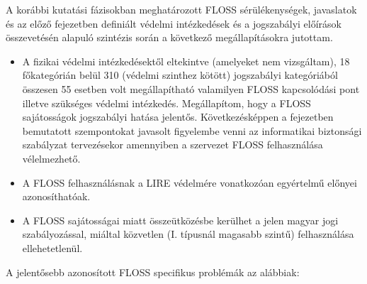 \documentclass[12pt,magyar,a4paper,oneside]{scrreprt}
\begin{document}
A korábbi kutatási fázisokban meghatározott FLOSS sérülékenységek,
javaslatok és az előző fejezetben definiált védelmi intézkedések és a
jogszabályi előírások összevetésén alapuló szintézis során a következő
megállapításokra jutottam.

\begin{itemize}
\item
  A fizikai védelmi intézkedésektől eltekintve (amelyeket nem
  vizsgáltam), 18 főkategórián belül 310 (védelmi szinthez kötött)
  jogszabályi kategóriából összesen 55 esetben volt megállapítható
  valamilyen FLOSS kapcsolódási pont illetve szükséges védelmi
  intézkedés. Megállapítom, hogy a FLOSS sajátosságok jogszabályi hatása
  jelentős. Következésképpen a fejezetben bemutatott szempontokat
  javasolt figyelembe venni az informatikai biztonsági szabályzat
  tervezésekor amennyiben a szervezet FLOSS felhasználása vélelmezhető.
\item
  A FLOSS felhasználásnak a LIRE védelmére vonatkozóan egyértelmű
  előnyei azonosíthatóak.
\item
  A FLOSS sajátosságai miatt összeütközésbe kerülhet a jelen magyar jogi
  szabályozással, miáltal közvetlen (I. típusnál magasabb szintű)
  felhasználása ellehetetlenül.
\end{itemize}

A jelentősebb azonosított FLOSS specifikus problémák az alábbiak:
\end{document}
